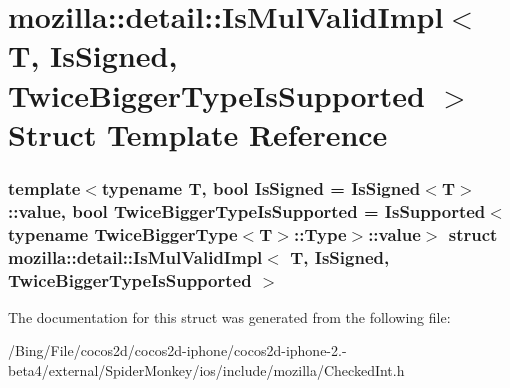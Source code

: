 \hypertarget{structmozilla_1_1detail_1_1_is_mul_valid_impl}{\section{mozilla\-:\-:detail\-:\-:Is\-Mul\-Valid\-Impl$<$ T, Is\-Signed, Twice\-Bigger\-Type\-Is\-Supported $>$ Struct Template Reference}
\label{structmozilla_1_1detail_1_1_is_mul_valid_impl}
}
\subsubsection*{template$<$typename T, bool Is\-Signed = Is\-Signed$<$\-T$>$\-::value, bool Twice\-Bigger\-Type\-Is\-Supported = Is\-Supported$<$typename Twice\-Bigger\-Type$<$\-T$>$\-::\-Type$>$\-::value$>$ struct mozilla\-::detail\-::\-Is\-Mul\-Valid\-Impl$<$ T, Is\-Signed, Twice\-Bigger\-Type\-Is\-Supported $>$}



The documentation for this struct was generated from the following file\-:\begin{DoxyCompactItemize}
\item 
/\-Bing/\-File/cocos2d/cocos2d-\/iphone/cocos2d-\/iphone-\/2.-\/beta4/external/\-Spider\-Monkey/ios/include/mozilla/Checked\-Int.\-h\end{DoxyCompactItemize}
